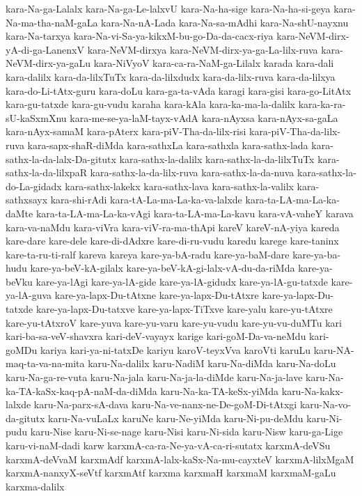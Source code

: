 {kara-Na-ga-Lalalx
kara-Na-ga-Le-lalxvU
kara-Na-ha-sige
kara-Na-ha-si-geya
kara-Na-ma-tha-naM-gaLa
kara-Na-nA-Lada
kara-Na-sa-mAdhi
kara-Na-shU-nayxnu
kara-Na-tarxya
kara-Na-vi-Sa-ya-kikxM-bu-go-Da-da-cacx-riya
kara-NeVM-dirx-yA-di-ga-LanenxV
kara-NeVM-dirxya
kara-NeVM-dirx-ya-ga-La-lilx-ruva
kara-NeVM-dirx-ya-gaLu
kara-NiVyoV
kara-ca-ra-NaM-ga-Lilalx
karada
kara-dali
kara-dalilx
kara-da-lilxTuTx
kara-da-lilxdudx
kara-da-lilx-ruva
kara-da-lilxya
kara-do-Li-tAtx-guru
kara-doLu
kara-ga-ta-vAda
karagi
kara-gisi
kara-go-LitAtx
kara-gu-tatxde
kara-gu-vudu
karaha
kara-kAla
kara-ka-ma-la-dalilx
kara-ka-ra-sU-kaSxmXnu
kara-me-se-ya-laM-tayx-vAdA
kara-nAyxsa
kara-nAyx-sa-gaLa
kara-nAyx-samaM
kara-pAterx
kara-piV-Tha-da-lilx-risi
kara-piV-Tha-da-lilx-ruva
kara-sapx-shaR-diMda
kara-sathxLa
kara-sathxla
kara-sathx-lada
kara-sathx-la-da-lalx-Da-gitutx
kara-sathx-la-dalilx
kara-sathx-la-da-lilxTuTx
kara-sathx-la-da-lilxpaR
kara-sathx-la-da-lilx-ruva
kara-sathx-la-da-nuva
kara-sathx-la-do-La-gidadx
kara-sathx-lakekx
kara-sathx-lava
kara-sathx-la-valilx
kara-sathxsayx
kara-shi-rAdi
kara-tA-La-ma-La-ka-va-lalxde
kara-ta-LA-ma-La-ka-daMte
kara-ta-LA-ma-La-ka-vAgi
kara-ta-LA-ma-La-kavu
kara-vA-vaheY
karava
kara-va-naMdu
kara-viVra
kara-viV-ra-ma-thApi
kareV
kareV-nA-yiya
kareda
kare-dare
kare-dele
kare-di-dAdxre
kare-di-ru-vudu
karedu
karege
kare-taninx
kare-ta-ru-ti-ralf
kareva
kareya
kare-ya-bA-radu
kare-ya-baM-dare
kare-ya-ba-hudu
kare-ya-beV-kA-gilalx
kare-ya-beV-kA-gi-lalx-vA-du-da-riMda
kare-ya-beVku
kare-ya-lAgi
kare-ya-lA-gide
kare-ya-lA-gidudx
kare-ya-lA-gu-tatxde
kare-ya-lA-guva
kare-ya-lapx-Du-tAtxne
kare-ya-lapx-Du-tAtxre
kare-ya-lapx-Du-tatxde
kare-ya-lapx-Du-tatxve
kare-ya-lapx-TiTxve
kare-yalu
kare-yu-tAtxre
kare-yu-tAtxroV
kare-yuva
kare-yu-varu
kare-yu-vudu
kare-yu-vu-duMTu
kari
kari-ba-sa-veV-shavxra
kari-deV-vayayx
karige
kari-goM-Da-va-neMdu
kari-goMDu
kariya
kari-ya-ni-tatxDe
kariyu
karoV-teyxVva
karoVti
karuLu
karu-NA-maq-ta-va-na-mita
karu-Na-dalilx
karu-NadiM
karu-Na-diMda
karu-Na-doLu
karu-Na-ga-re-vuta
karu-Na-jala
karu-Na-ja-la-diMde
karu-Na-ja-lave
karu-Na-ka-TA-kaSx-kaq-pA-naM-da-diMda
karu-Na-ka-TA-keSx-yiMda
karu-Na-kakx-lalxde
karu-Na-parx-sA-dava
karu-Na-ve-nanx-ne-De-goM-Di-tAtxgi
karu-Na-vo-da-gitutx
karu-Na-vuLaLx
karuNe
karu-Ne-yiMda
karu-Ni-pu-deMdu
karu-Ni-pudu
karu-Nise
karu-Ni-se-nage
karu-Nisi
karu-Ni-sida
karu-Nisw
karu-ga-Lige
karu-vi-naM-dadi
karw
karxmA-ca-ra-Ne-ya-vA-ca-ri-sutatx
karxmA-deVSu
karxmA-deVvaM
karxmAdf
karxmA-lalx-kaSx-Na-mu-cayxteV
karxmA-lilxMgaM
karxmA-nanxyX-seVtf
karxmAtf
karxma
karxmaH
karxmaM
karxmaM-gaLu
karxma-dalilx
}
